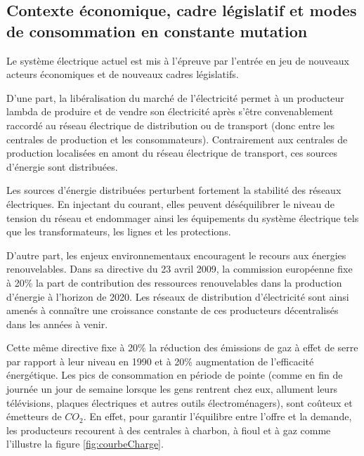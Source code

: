 \subsection{Contexte économique, cadre législatif et modes de con\-sommation en 
constante mutation}

Le système électrique actuel est mis à l'épreuve par l'entrée en jeu de nouveaux 
acteurs économiques et de nouveaux cadres législatifs. 

D'une part, la libéralisation du marché de l'électricité permet à un producteur 
lambda de produire et de vendre son électricité après s'être convenablement 
raccordé au réseau électrique de distribution ou de transport (donc entre les 
centrales de production et les consommateurs). Contrairement aux centrales de 
production localisées en amont du réseau électrique de transport, ces sources 
d'énergie sont distribuées. 

Les sources d'énergie distribuées perturbent fortement la stabilité des réseaux 
électriques. En injectant du courant, elles peuvent déséquilibrer le niveau de 
tension du réseau et endommager ainsi les équipements du système électrique tels 
que les transformateurs, les lignes et les protections. 

D'autre part, les enjeux environnementaux encouragent le recours aux énergies 
renouvelables. Dans sa directive du 23 avril 2009, la commission européenne fixe 
à 20\% la part de contribution des ressources renouvelables dans la production 
d'énergie à l'horizon de 2020. Les réseaux de distribution d'électricité sont 
ainsi amenés à connaître une croissance constante de ces producteurs 
décentralisés dans les années à venir.

Cette même directive fixe à 20\% la réduction des émissions de gaz à effet de 
serre par rapport à leur niveau en 1990 et à 20\% augmentation de l'efficacité 
énergétique. Les pics de consommation en période de pointe (comme en fin de 
journée un jour de semaine lorsque les gens rentrent chez eux, allument leurs 
télévisions, plaques électriques et autres outils électroménagers), sont coûteux 
et émetteurs de $CO_{2}$. En effet, pour garantir l'équilibre entre l'offre et 
la demande, les producteurs recourent à des centrales à charbon, à fioul et à 
gaz comme l'illustre la figure \ref{fig:courbeCharge}.

